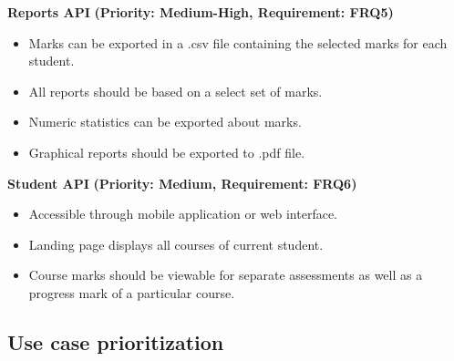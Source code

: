 \documentclass[12pt]{article}
\begin{document}
			\vspace{0.15in}
			
			\begin{flushleft}
				\textbf{Reports API}
				\textbf{(Priority: Medium-High, Requirement: FRQ5)}
			\end{flushleft}
						
			\vspace{0.02in}
			
			\begin{itemize}
				\item Marks can be exported in a .csv file containing the selected marks for each student.
				\item All reports should be based on a select set of marks.
				\item Numeric statistics can be exported about marks.
				\item Graphical reports should be exported to .pdf file.
			\end{itemize}
				
			\vspace{0.2in}
			
			\begin{flushleft}
				\textbf{Student API}
				\textbf{(Priority: Medium, Requirement: FRQ6)}
			\end{flushleft}
			
			\vspace{0.02in}
			
			\begin{itemize}
				\item Accessible through mobile application or web interface.
				\item Landing page displays all courses of current student.
				\item Course marks should be viewable for separate assessments as well as a progress mark of a particular course.
			\end{itemize}
				
			\vspace{0.2in}
		
		\subsection{Use case prioritization}
		
			\vspace{0.2in}
			
\end{document}
